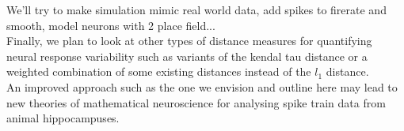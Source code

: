 We'll try to make simulation mimic real world data, add spikes to firerate and smooth,  model neurons with 2 place field...\\

Finally, we plan to look at other types of distance measures for quantifying neural response variability such as variants of the kendal tau distance  or a weighted combination of some existing distances instead of the $l_1$ distance.\\

An improved approach such as the one we envision and outline here  may lead to new theories of mathematical neuroscience for analysing spike train data from animal hippocampuses.















